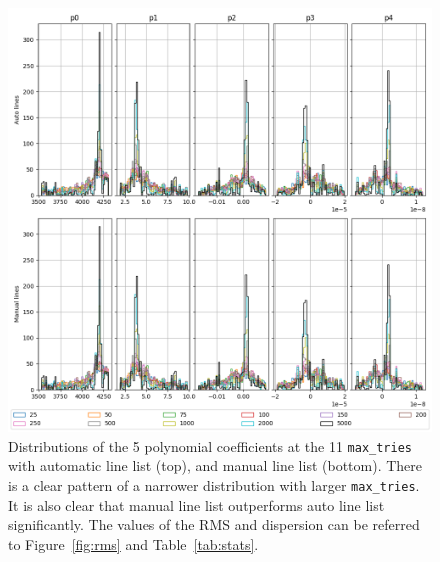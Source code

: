 \documentclass{aa}
\begin{document}
\begin{figure}[h]
    \centering
    \includegraphics[width=\textwidth]{figure_2_polynomial_coefficients.png}
    \caption{Distributions of the 5 polynomial coefficients at the 11 \texttt{max\_tries} with automatic line list (top), and manual line list (bottom). There is a clear pattern of a narrower distribution with larger \texttt{max\_tries}. It is also clear that manual line list outperforms auto line list significantly. The values of the RMS and dispersion can be referred to Figure~\ref{fig:rms} and Table~\ref{tab:stats}.}
    \label{fig:coefficients}
\end{figure}
\end{document}
